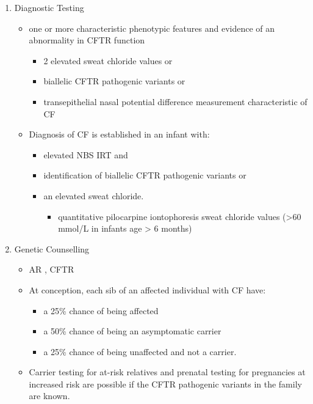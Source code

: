 \documentclass[12pt]{scrartcl}
\begin{document}
\begin{enumerate}
\item Diagnostic Testing
\label{sec:org445d2aa}
\begin{itemize}
\item one or more characteristic phenotypic features and evidence of an abnormality in CFTR function
\begin{itemize}
\item 2 elevated sweat chloride values or
\item biallelic CFTR pathogenic variants or
\item transepithelial nasal potential difference measurement characteristic of CF
\end{itemize}
\item Diagnosis of CF is established in an infant with:
\begin{itemize}
\item elevated NBS IRT and
\item identification of biallelic CFTR pathogenic variants or
\item an elevated sweat chloride.
\begin{itemize}
\item quantitative pilocarpine iontophoresis sweat chloride values (>60 mmol/L in infants age > 6 months)
\end{itemize}
\end{itemize}
\end{itemize}
\item Genetic Counselling
\label{sec:orgd8a7a46}
\begin{itemize}
\item AR , CFTR
\item At conception, each sib of an affected individual with CF have:
\begin{itemize}
\item a 25\% chance of being affected
\item a 50\% chance of being an asymptomatic carrier
\item a 25\% chance of being unaffected and not a carrier.
\end{itemize}
\item Carrier testing for at-risk relatives and prenatal testing for pregnancies at increased risk are possible if the CFTR pathogenic variants in the family are known.
\end{itemize}
\end{enumerate}
\end{document}
